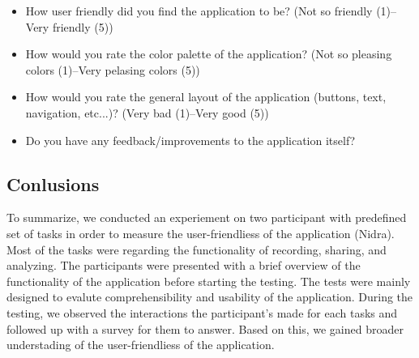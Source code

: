 \begin{itemize}
    \item How user friendly did you find the application to be? (Not so friendly (1)--Very friendly (5))
    \item How would you rate the color palette of the application? (Not so pleasing colors (1)--Very pelasing colors (5))
    \item How would you rate the general layout of the application (buttons, text, navigation, etc...)? (Very bad (1)--Very good (5))
    \item Do you have any feedback/improvements to the application itself?
    \begin{description}[font=\normalfont\itshape]
        \item[Participent A:]
        \item[Participent B:] 
    \end{description}
\end{itemize}


\subsection{Conlusions}

To summarize, we conducted an experiement on two participant with predefined set of tasks in order to measure the user-friendliess of the application (Nidra). Most of the tasks were regarding the functionality of recording, sharing, and analyzing. The participants were presented with a brief overview of the functionality of the application before starting the testing. The tests were mainly designed to evalute comprehensibility and usability of the application. During the testing, we observed the interactions the participant's made for each tasks and followed up with a survey for them to answer. Based on this, we gained broader understading of the user-friendliess of the application.

